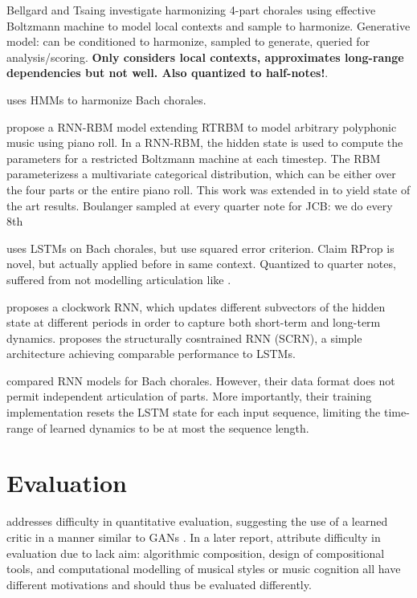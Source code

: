 \documentclass[dissertation.tex]{subfiles}
\begin{document}
Bellgard and Tsaing investigate harmonizing 4-part chorales using effective
Boltzmann machine \cite{bellgard1994harmonizing} to model local contexts and
sample to harmonize. Generative model: can be conditioned to harmonize, sampled
to generate, queried for analysis/scoring. \textbf{Only considers local contexts, approximates
long-range dependencies but not well. Also quantized to half-notes!}.

\cite{Allan2005} uses HMMs to harmonize Bach chorales.

\cite{Boulanger-Lewandowski2012} propose a RNN-RBM model extending RTRBM \cite{sutskever2009recurrent}
to model arbitrary polyphonic music using piano roll. In a RNN-RBM, the hidden
state is used to compute the parameters for a restricted Boltzmann machine at
each timestep. The RBM parameterizess a multivariate categorical distribution,
which can be either over the four parts or the entire piano roll. This work was
extended in \cite{Lyu2015} to yield state of the art results. Boulanger sampled
at every quarter note for JCB: we do every 8th 

\cite{Liu2014} uses LSTMs on Bach chorales, but use squared error criterion. Claim RProp
is novel, but actually applied before \cite{riedmiller1993direct} in same context. Quantized
to quarter notes, suffered from not modelling articulation like \cite{Eck2002}.

\cite{Koutnik2014} proposes a clockwork RNN, which updates different subvectors
of the hidden state at different periods in order to capture both short-term
and long-term dynamics. \cite{Mikolov2015} proposes the structurally
cosntrained RNN (SCRN), a simple architecture achieving comparable performance
to LSTMs.

\cite{Brien2016} compared RNN models for Bach chorales. However, their data format does not permit independent
articulation of parts. More importantly, their training implementation resets the LSTM state for each input
sequence, limiting the time-range of learned dynamics to be at most the sequence length.

\section{Evaluation}

\cite{pearce2001towards} addresses difficulty in quantitative evaluation,
suggesting the use of a learned critic in a manner similar to GANs
\cite{goodfellow2014generative}. In a later report,
\cite{pearce2002motivations} attribute difficulty in evaluation due to lack
aim: algorithmic composition, design of compositional tools, and computational
modelling of musical styles or music cognition all have different motivations
and should thus be evaluated differently.

\printbibliography
\end{document}
